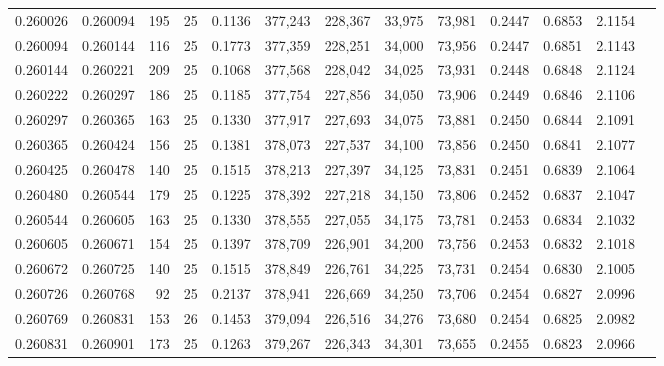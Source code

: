 \begin{tabular}{rrrrrrrrrrrrr}
0.260026 & 0.260094 &   195 &  25 &                                     0.1136 & 377,243 & 228,367 &  33,975 &  73,981 & 0.2447 & 0.6853 & 2.1154 \\
0.260094 & 0.260144 &   116 &  25 &                                     0.1773 & 377,359 & 228,251 &  34,000 &  73,956 & 0.2447 & 0.6851 & 2.1143 \\
0.260144 & 0.260221 &   209 &  25 &                                     0.1068 & 377,568 & 228,042 &  34,025 &  73,931 & 0.2448 & 0.6848 & 2.1124 \\
0.260222 & 0.260297 &   186 &  25 &                                     0.1185 & 377,754 & 227,856 &  34,050 &  73,906 & 0.2449 & 0.6846 & 2.1106 \\
0.260297 & 0.260365 &   163 &  25 &                                     0.1330 & 377,917 & 227,693 &  34,075 &  73,881 & 0.2450 & 0.6844 & 2.1091 \\
0.260365 & 0.260424 &   156 &  25 &                                     0.1381 & 378,073 & 227,537 &  34,100 &  73,856 & 0.2450 & 0.6841 & 2.1077 \\
0.260425 & 0.260478 &   140 &  25 &                                     0.1515 & 378,213 & 227,397 &  34,125 &  73,831 & 0.2451 & 0.6839 & 2.1064 \\
0.260480 & 0.260544 &   179 &  25 &                                     0.1225 & 378,392 & 227,218 &  34,150 &  73,806 & 0.2452 & 0.6837 & 2.1047 \\
0.260544 & 0.260605 &   163 &  25 &                                     0.1330 & 378,555 & 227,055 &  34,175 &  73,781 & 0.2453 & 0.6834 & 2.1032 \\
0.260605 & 0.260671 &   154 &  25 &                                     0.1397 & 378,709 & 226,901 &  34,200 &  73,756 & 0.2453 & 0.6832 & 2.1018 \\
0.260672 & 0.260725 &   140 &  25 &                                     0.1515 & 378,849 & 226,761 &  34,225 &  73,731 & 0.2454 & 0.6830 & 2.1005 \\
0.260726 & 0.260768 &    92 &  25 &                                     0.2137 & 378,941 & 226,669 &  34,250 &  73,706 & 0.2454 & 0.6827 & 2.0996 \\
0.260769 & 0.260831 &   153 &  26 &                                     0.1453 & 379,094 & 226,516 &  34,276 &  73,680 & 0.2454 & 0.6825 & 2.0982 \\
0.260831 & 0.260901 &   173 &  25 &                                     0.1263 & 379,267 & 226,343 &  34,301 &  73,655 & 0.2455 & 0.6823 & 2.0966 \\

\end{tabular}
